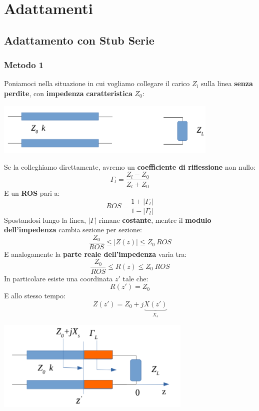 \chapter{Adattamenti}
\section{Adattamento con Stub Serie}
\subsection{Metodo 1}
Poniamoci nella situazione in cui vogliamo collegare il carico $Z_l$ sulla linea \textbf{senza} \textbf{perdite}, con \textbf{impedenza} \textbf{caratteristica} $Z_0$:
\begin{center}
    \includegraphics[width=0.8\textwidth]{Images/figure21.png}
\end{center}
Se la colleghiamo direttamente, avremo un \textbf{coefficiente di riflessione} non nullo:
\begin{equation*}
    \Gamma_l = \frac{Z_l - Z_0}{Z_l + Z_0}
\end{equation*}
E un \textbf{ROS} pari a:
\begin{equation*}
    ROS = \frac{1 + |\Gamma_l|}{1 - |\Gamma_l|}
\end{equation*}
Spostandosi lungo la linea, $|\Gamma|$ rimane \textbf{costante}, mentre il \textbf{modulo dell'impedenza} cambia sezione per sezione:
\begin{equation*}
    \frac{Z_0}{ROS} \leq |Z(z)| \leq Z_0 \ ROS
\end{equation*}
E analogamente la \textbf{parte reale dell'impedenza} varia tra:
\begin{equation*}
    \frac{Z_0}{ROS} \leq R(z) \leq Z_0 \ ROS   
\end{equation*}
In particolare esiste una coordinata $z'$ tale che:
\begin{equation*}
    R(z') = Z_0
\end{equation*}
E allo stesso tempo:
\begin{equation*}
    Z(z') = Z_0 + j \underbrace{X(z')}_{X_s}
\end{equation*}
\begin{center}
    \includegraphics[width=0.7\textwidth]{Images/figure22.png}
\end{center}
